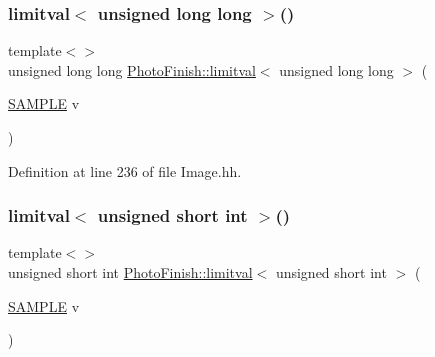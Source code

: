 \mbox{\label{namespace_photo_finish_a4414478a05e84d6082884d9b16f7c6f5}} 
\subsubsection{\texorpdfstring{limitval$<$ unsigned long long $>$()}{limitval< unsigned long long >()}}
{\footnotesize\ttfamily template$<$$>$ \\
unsigned long long \hyperlink{namespace_photo_finish_aa019419c2456e119283e24d6e6fa3cbb}{Photo\+Finish\+::limitval}$<$ unsigned long long $>$ (\begin{DoxyParamCaption}\item[{\hyperlink{sample_8h_afc597c76b4f04a2da506a240d51d89a0}{S\+A\+M\+P\+LE}}]{v }\end{DoxyParamCaption})\hspace{0.3cm}{\ttfamily [inline]}}



Definition at line 236 of file Image.\+hh.

\mbox{\label{namespace_photo_finish_ab0f7bd944750509695fbac805f21ed42}} 
\subsubsection{\texorpdfstring{limitval$<$ unsigned short int $>$()}{limitval< unsigned short int >()}}
{\footnotesize\ttfamily template$<$$>$ \\
unsigned short int \hyperlink{namespace_photo_finish_aa019419c2456e119283e24d6e6fa3cbb}{Photo\+Finish\+::limitval}$<$ unsigned short int $>$ (\begin{DoxyParamCaption}\item[{\hyperlink{sample_8h_afc597c76b4f04a2da506a240d51d89a0}{S\+A\+M\+P\+LE}}]{v }\end{DoxyParamCaption})\hspace{0.3cm}{\ttfamily [inline]}}



